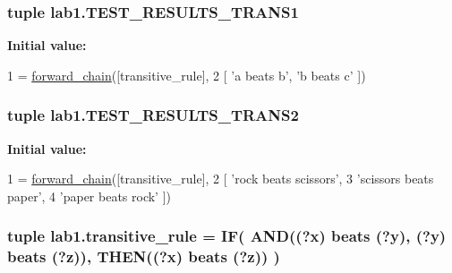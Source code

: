 \subsubsection[{T\+E\+S\+T\+\_\+\+R\+E\+S\+U\+L\+T\+S\+\_\+\+T\+R\+A\+N\+S1}]{\setlength{\rightskip}{0pt plus 5cm}tuple lab1.\+T\+E\+S\+T\+\_\+\+R\+E\+S\+U\+L\+T\+S\+\_\+\+T\+R\+A\+N\+S1}\label{namespacelab1_a03f037dc8135fd5ee9d98bf9e786edbc}
{\bfseries Initial value\+:}
\begin{DoxyCode}
1 = \hyperlink{namespaceproduction_af279b12f495c76be9424cb6cf0fa014f}{forward\_chain}([transitive\_rule],
2                                     [ \textcolor{stringliteral}{'a beats b'}, \textcolor{stringliteral}{'b beats c'} ])
\end{DoxyCode}
\hypertarget{namespacelab1_a9eba4ad17bd9f310be03c78208c8d7da}{}
\subsubsection[{T\+E\+S\+T\+\_\+\+R\+E\+S\+U\+L\+T\+S\+\_\+\+T\+R\+A\+N\+S2}]{\setlength{\rightskip}{0pt plus 5cm}tuple lab1.\+T\+E\+S\+T\+\_\+\+R\+E\+S\+U\+L\+T\+S\+\_\+\+T\+R\+A\+N\+S2}\label{namespacelab1_a9eba4ad17bd9f310be03c78208c8d7da}
{\bfseries Initial value\+:}
\begin{DoxyCode}
1 = \hyperlink{namespaceproduction_af279b12f495c76be9424cb6cf0fa014f}{forward\_chain}([transitive\_rule],
2   [ \textcolor{stringliteral}{'rock beats scissors'}, 
3     \textcolor{stringliteral}{'scissors beats paper'}, 
4     \textcolor{stringliteral}{'paper beats rock'} ])
\end{DoxyCode}
\hypertarget{namespacelab1_a29f6dd5bbb2091f0647b3da4e0ac0a04}{}
\subsubsection[{transitive\+\_\+rule}]{\setlength{\rightskip}{0pt plus 5cm}tuple lab1.\+transitive\+\_\+rule = {\bf I\+F}( {\bf A\+N\+D}(\textquotesingle{}(?x) beats (?y)\textquotesingle{}, \textquotesingle{}(?y) beats (?z)\textquotesingle{}), {\bf T\+H\+E\+N}(\textquotesingle{}(?x) beats (?z)\textquotesingle{}) )}\label{namespacelab1_a29f6dd5bbb2091f0647b3da4e0ac0a04}
\hypertarget{namespacelab1_a94d8fb89809d33d8772ac1e6346b9df9}{}

